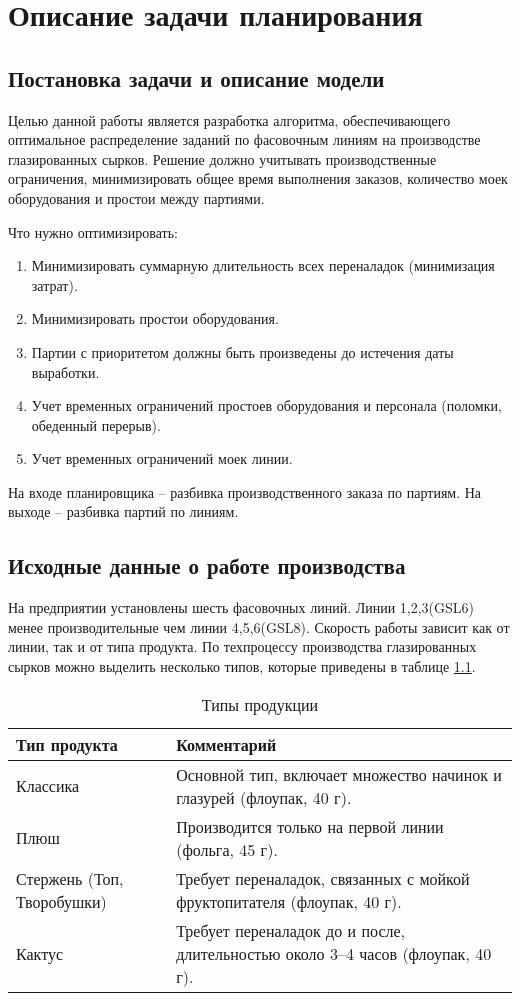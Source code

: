 \chapter{ Описание задачи планирования}
\label{ch:chapter2}

\section{Постановка задачи и описание модели}
Целью данной работы является разработка алгоритма, обеспечивающего оптимальное распределение заданий по фасовочным линиям на производстве глазированных сырков. Решение должно учитывать производственные ограничения, минимизировать общее время выполнения заказов, количество моек оборудования и простои между партиями.

Что нужно оптимизировать:

\begin{enumerate}
	\item Минимизировать суммарную длительность всех переналадок (минимизация затрат).
	\item Минимизировать простои оборудования.
	\item Партии с приоритетом должны быть произведены до истечения даты выработки.
	\item Учет временных ограничений простоев оборудования и персонала (поломки, обеденный перерыв).
	\item Учет временных ограничений моек линии.
\end{enumerate}

На входе планировщика – разбивка производственного заказа по партиям. На выходе – разбивка партий по линиям.

\section{Исходные данные о работе производства}

На предприятии установлены шесть фасовочных линий.  Линии 1,2,3(GSL6) менее производительные чем линии 4,5,6(GSL8). Скорость работы зависит как от линии, так и от типа продукта. По техпроцессу производства глазированных сырков можно выделить несколько типов, которые приведены в таблице \ref{table:ProductsType}.
\begin{table}[h]
\centering
\caption{Типы продукции}
\begin{tabularx}{\textwidth}{|l|X|}
\hline
\textbf{Тип продукта} & \textbf{Комментарий} \\
\hline
Классика                   & Основной тип, включает множество начинок и глазурей (флоупак, 40 г). \\
\hline
Плюш                       & Производится только на первой линии (фольга, 45 г). \\
\hline
Стержень (Топ, Творобушки) & Требует переналадок, связанных с мойкой фруктопитателя (флоупак, 40 г). \\
\hline
Кактус                     & Требует переналадок до и после, длительностью около 3--4 часов (флоупак, 40 г). \\
\hline
\end{tabularx}
\label{table:ProductsType}
\end{table}

